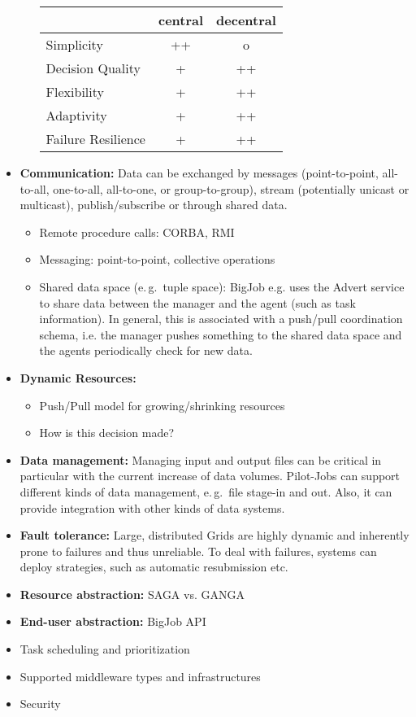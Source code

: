 \documentclass[]{article}
\begin{document}
\begin{itemize}
\begin{itemize}
			\begin{tabular}{|l|c|c|}
				\hline
				&central &decentral\\
				\hline
			Simplicity  &++			&o \\ \hline
			Decision Quality &+ 	&++ \\ \hline
			Flexibility &+			&++ \\ \hline
			Adaptivity  &+ 			&++ \\ \hline
			Failure Resilience &+   &++\\ \hline
			
			\end{tabular}

	\end{itemize}	
	\item \textbf{Communication:} Data can be exchanged by messages
(point-to-point, all-to-all, one-to-all, all-to-one, or group-to-group),
stream (potentially unicast or multicast), publish/subscribe or through shared
data.
	\begin{itemize}
		\item Remote procedure calls: CORBA, RMI
		\item Messaging: point-to-point, collective operations
		\item Shared data space (e.\,g.\ tuple space): BigJob e.g. uses the Advert service to share data between the manager and the agent (such as task information). In general, this is associated with a push/pull coordination schema, i.e. the manager pushes something to the shared data space and the agents periodically check for new data.
	\end{itemize} 
	\item \textbf{Dynamic Resources:}
		\begin{itemize}
			\item Push/Pull model for growing/shrinking resources
			\item How is this decision made?
		\end{itemize}
	\item \textbf{Data management:} Managing input and output files can be critical in particular with the current increase of data volumes. Pilot-Jobs can support different kinds of data management, e.\,g.\ file stage-in and out. Also, it can provide integration with other kinds of data systems.
	\item \textbf{Fault tolerance:} Large, distributed Grids are highly dynamic and inherently prone to failures and thus unreliable. To deal with failures, systems can deploy strategies, such as automatic resubmission etc.
	\item \textbf{Resource abstraction:} SAGA vs. GANGA
	\item \textbf{End-user abstraction:} BigJob API
	\item Task scheduling and prioritization
	\item Supported middleware types and infrastructures	
	\item Security
\end{itemize}
\end{document}
